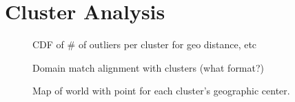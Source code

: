 \section{Cluster Analysis} \label{sect:analysis}


\begin{figure}
    \caption{CDF of \# of outliers per cluster for geo distance, etc}
\end{figure}

\begin{figure}
    \caption{Domain match alignment with clusters (what format?)}
\end{figure}

\begin{figure}
    \caption{Map of world with point for each cluster's geographic center.}
\end{figure}

